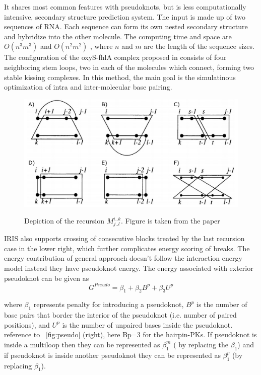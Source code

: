 \documentclass[twoside,a4paper]{report}
\begin{document}
	It shares most common features with pseudoknots, but is less computationally intensive, secondary structure prediction system. The input is made up of two sequences of RNA. Each sequence can form its own nested secondary structure and hybridize into the other molecule. The computing time and space are $O(n^3m^3)$ and $O(n^2m^2)$ , where $n$ and $m$ are the length of the sequence sizes. The configuration of the oxyS-fhlA complex proposed in \citep{argaman2000fhla} consists of four neighboring stem loops, two in each of the molecules which connect, forming two stable kissing complexes. In this method, the main goal is the simulatinous optimization of intra and inter-molecular base pairing.\\

	\begin{figure}[tb]
		\includegraphics[width=0.9\linewidth]{iris}
		\centering
		\caption{ Depiction of the recursion $M^{i..k}_{j..l}$. Figure is taken from the paper} 
		\citep{pervouchine2004iris}
		\label{fig:iris}
	\end{figure}
	
	IRIS also supports crossing of consecutive blocks treated by the last recursion case in the lower right, which further complicates energy scoring of breaks. The energy contribution of general approach doesn't follow the interaction energy model instead they have pseudoknot energy. The energy associated with exterior pseudoknot can be given as \citep{xu2015physics} \\
	
		\begin{equation}
		G^{Pseudo} = \beta_1 + \beta_2 B^p + \beta_3 U^p
		\end{equation}
		
	where $\beta_1$ represents penalty for introducing a pseudoknot, $B^p$ is the number of base pairs that border the interior of the pseudoknot (i.e. number of paired positions), and $U^p$ is the number of unpaired bases inside the pseudoknot. reference to ~\ref{fig:pseudo} (right), here Bp=3 for the hairpin-PKs. If pseudoknot is inside a multiloop then they can be represented as $\beta_1^m$ ( by replacing the $\beta_1$) and if pseudoknot is inside another pseudoknot they can be  represented as $\beta_1^p$ (by replacing $\beta_1$).\\
	
\end{document}
